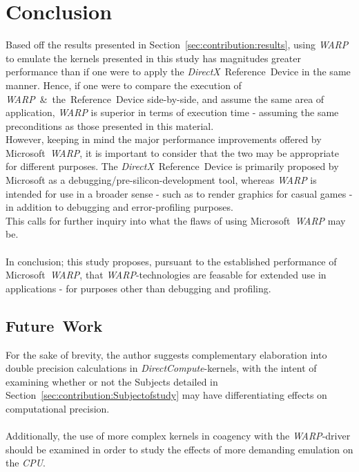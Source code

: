 \documentclass[fleqn,10pt]{SelfArx} %
\begin{document}
\section{Conclusion}
\label{sec:conclusion}
Based off the results presented in Section~\ref{sec:contribution:results}, using \textit{WARP} to emulate the kernels presented in this study has magnitudes greater performance than if one were to apply the \textit{DirectX}~Reference~Device in the same manner. Hence, if one were to compare the execution of \textit{WARP}~\&~the~Reference~Device side-by-side, and assume the same area of application, \textit{WARP} is superior in terms of execution time - assuming the same preconditions as those presented in this material.\\
However, keeping in mind the major performance improvements offered by Microsoft~\textit{WARP}, it is important to consider that the two may be appropriate for different purposes. The \textit{DirectX}~Reference~Device is primarily proposed by Microsoft as a debugging/pre-silicon-development tool, whereas \textit{WARP} is intended for use in a broader sense - such as to render graphics for casual games - in addition to debugging and error-profiling purposes.\\
This calls for further inquiry into what the flaws of using Microsoft~\textit{WARP} may be.\\
\\
In conclusion; this study proposes, pursuant to the established performance of Microsoft~\textit{WARP}, that \textit{WARP}-technologies are feasable for extended use in applications - for purposes other than debugging and profiling. 




\subsection{Future~Work}
\label{sec:conclusion:futurework}
For the sake of brevity, the author suggests complementary elaboration into double precision calculations in \textit{DirectCompute}-kernels, with the intent of examining whether or not the Subjects detailed in Section~\ref{sec:contribution:Subjectofstudy} may have differentiating effects on computational precision.\\
\\
Additionally, the use of more complex kernels  in coagency with the \textit{WARP}-driver should be examined in order to study the effects of more demanding emulation on the \textit{CPU}.
\end{document}

